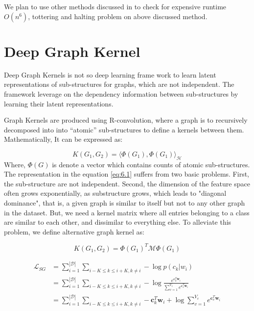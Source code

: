 \documentclass[12pt,a4paper]{article}
\numberwithin{equation}{section}
\numberwithin{figure}{section}
\numberwithin{table}{section}
\begin{document}
We plan to use other methods discussed in \citet{Vishwanathan2010} to check for expensive runtime $O(n^{6})$, tottering and halting \citep{Borgwardt2005} problem on above discussed method.

\section{Deep Graph Kernel}

Deep Graph Kernels \citep{Yanardag2015} is not so deep learning frame work to learn latent representations of sub-structures for graphs, which are not independent. The framework leverage on the dependency information between sub-structures by learning their latent representations. 

Graph Kernels are produced using R-convolution, where a graph is to recursively decomposed into into “atomic” sub-structures to define a kernels between them.  Mathematically, It can be expressed as:

%
\begin{equation}\label{eq:6.1}
K(G_{1}, G_{2}) = {\Bigg \langle \Phi(G_{1}), \Phi(G_{1}) \Bigg \rangle}_{\mathcal{H}}
\end{equation}
%
Where, $\Phi(G)$ is denote a vector which contains counts of atomic sub-structures. The representation in the equation \ref{eq:6.1} suffers from two basic problems. First, the sub-structure are not independent. Second, the dimension of the feature space often grows exponentially, as substructure grows, which leads to "diagonal dominance", that is, a given graph is similar to itself but not to any other graph in the dataset. But, we need a kernel matrix where all entries belonging to a class
are similar to each other, and dissimilar to everything else. To alleviate this problem, we define alternative graph kernel as:

%
\begin{equation}\label{eq:6.1}
K(G_{1}, G_{2}) = \Phi(G_{1})^{T} \mathcal{M} \Phi(G_{1})
\end{equation}
%


%
\begin{equation}

\begin{split}\label{eq:SG} 

\mathcal{L}_{SG} &= \sum_{i=1}^{|\mathcal{D}|} \sum_{i-K\le k \le i+K, k\ne i} - \log p(c_{k} | w_{i}) \\ &= \sum_{i=1}^{|\mathcal{D}|} \sum_{i-K\le k \le i+K, k\ne i} - \log \frac{e^{\mathbf{c}_{k}^{T}\mathbf{w}_{i}}}{\sum_{v=1}^{V_{c}} e^{\mathbf{c}_{v}^{T}\mathbf{w}_{i}}} \\ &= \sum_{i=1}^{|\mathcal{D}|} \sum_{i-K\le k \le i+K, k\ne i} - \mathbf{c}_{k}^{T}\mathbf{w}_{i} + \log \sum_{v=1}^{V_{c}} e^{\mathbf{c}_{v}^{T}\mathbf{w}_{i}} 

\end{split}

\end{equation}
%
 
\end{document}
